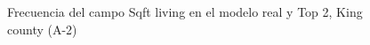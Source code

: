 \begin{figure}[H]
    \centering
    
    \caption{Frecuencia del campo Sqft living en el modelo real y Top 2, King county (A-2)}
    \label{frecuency-top2-sqft living}
\end{figure}